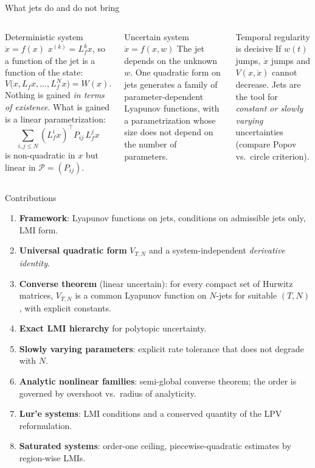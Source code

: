 \documentclass[10pt,aspectratio=169]{beamer}
\newcommand{\tr}{^{\top}}
\newcommand{\PP}{\mathcal{P}}
\begin{document}
\begin{frame}{What jets do and do not bring}
\begin{columns}
\begin{block}{Deterministic system $\dot x=f(x)$}
$x^{(k)}=L_f^kx$, so a function of the jet is a function of the state:
\[
V\big(x,L_fx,\dots,L_f^Nx\big)=W(x).
\]
Nothing is gained \emph{in terms of existence}. What is gained is a \alert{linear parametrization}:
\[
\sum_{i,j\le N}(L_f^ix)\tr P_{ij}\,L_f^jx
\]
is non-quadratic in $x$ but linear in $\PP=(P_{ij})$.
\end{block}
\begin{block}{Uncertain system $\dot x=f(x,w)$}
The jet depends on the unknown $w$. One quadratic form on jets generates a \alert{family} of parameter-dependent Lyapunov functions, with a parametrization whose size does not depend on the number of parameters.
\end{block}
\begin{block}{Temporal regularity is decisive}
If $w(t)$ jumps, $\dot x$ jumps and $V(x,\dot x)$ cannot decrease. Jets are the tool for \emph{constant or slowly varying} uncertainties (compare Popov vs.\ circle criterion).
\end{block}
\end{columns}
\end{frame}

\begin{frame}{Contributions}
\begin{enumerate}
\item \textbf{Framework}: Lyapunov functions on jets, conditions on admissible jets only, LMI form.
\item \textbf{Universal quadratic form} $V_{T,N}$ and a system-independent \emph{derivative identity}.
\item \textbf{Converse theorem} (linear uncertain): for every compact set of Hurwitz matrices, $V_{T,N}$ is a common Lyapunov function on $N$-jets for suitable $(T,N)$, with explicit constants.
\item \textbf{Exact LMI hierarchy} for polytopic uncertainty.
\item \textbf{Slowly varying parameters}: explicit rate tolerance that does not degrade with $N$.
\item \textbf{Analytic nonlinear families}: semi-global converse theorem; the order is governed by overshoot vs.\ radius of analyticity.
\item \textbf{Lur'e systems}: LMI conditions and a conserved quantity of the LPV reformulation.
\item \textbf{Saturated systems}: order-one ceiling, piecewise-quadratic estimates by region-wise LMIs.
\end{enumerate}
\end{frame}
\end{document}
